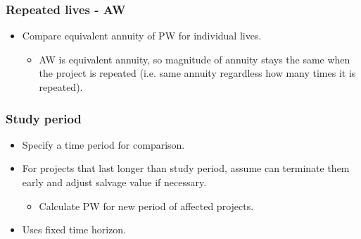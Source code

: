 \begin{example}
\end{example}

\subsubsection{Repeated lives - AW}
\begin{definition}
    \begin{itemize}
        \item Compare equivalent annuity of PW for individual lives.
        \begin{itemize}
            \item AW is equivalent annuity, so magnitude of annuity stays the same when the project is repeated (i.e. same annuity regardless how many times it is repeated).
        \end{itemize}
    \end{itemize}
\end{definition}

\begin{example}
\end{example}
    
\subsubsection{Study period}
\begin{definition}
    \begin{itemize}
        \item Specify a time period for comparison. 
        \item For projects that last longer than study period, assume can terminate them early and adjust salvage value if necessary.
        \begin{itemize}
            \item Calculate PW for new period of affected projects. 
        \end{itemize}
        \item Uses fixed time horizon. 
    \end{itemize}
\end{definition}

\begin{example}
\end{example}